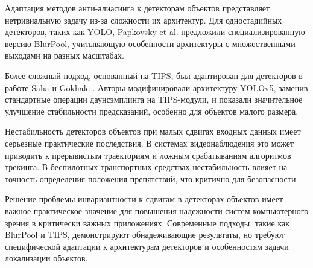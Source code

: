 Адаптация методов анти-алиасинга к детекторам объектов представляет нетривиальную задачу из-за сложности их архитектур. Для одностадийных детекторов, таких как YOLO, Papkovsky et al. \cite{papkovsky2023shift} предложили специализированную версию BlurPool, учитывающую особенности архитектуры с множественными выходами на разных масштабах.

Более сложный подход, основанный на TIPS, был адаптирован для детекторов в работе Saha и Gokhale \cite{saha2024tips}. Авторы модифицировали архитектуру YOLOv5, заменив стандартные операции даунсэмплинга на TIPS-модули, и показали значительное улучшение стабильности предсказаний, особенно для объектов малого размера.

Нестабильность детекторов объектов при малых сдвигах входных данных имеет серьезные практические последствия. В системах видеонаблюдения это может приводить к прерывистым траекториям и ложным срабатываниям алгоритмов трекинга. В беспилотных транспортных средствах нестабильность влияет на точность определения положения препятствий, что критично для безопасности.

Решение проблемы инвариантности к сдвигам в детекторах объектов имеет важное практическое значение для повышения надежности систем компьютерного зрения в критически важных приложениях. Современные подходы, такие как BlurPool и TIPS, демонстрируют обнадеживающие результаты, но требуют специфической адаптации к архитектурам детекторов и особенностям задачи локализации объектов.

\newpage
